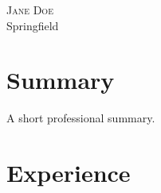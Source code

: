 \documentclass[letterpaper,11pt]{article}
\begin{document}
\begin{center}
{\Huge \scshape Jane Doe} \\ \vspace{5pt}
\small Springfield
\end{center}

\section{Summary}
{\small A short professional summary.}

\section{Experience}
\end{document}
